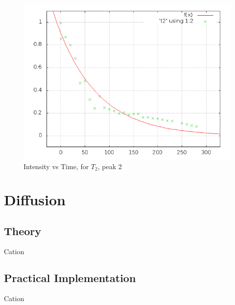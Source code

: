 		\begin{figure}[bth]
			\begin{center}
				\includegraphics[width=1.1\linewidth]{gfx/e3_T2P2}
			\end{center}
		\caption[$T_2$, peak 2]{Intensity vs Time, for $T_2$, peak 2}
		\label{e3T2P2}
		\end{figure}


\section{Diffusion}
	\subsection{Theory}
		Cation
	\subsection{Practical Implementation}
		Cation


